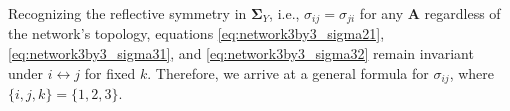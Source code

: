 \documentclass{article}
\begin{document}
Recognizing the reflective symmetry in $\mathbf{\Sigma}_Y$, i.e., $\sigma_{ij}=\sigma_{ji}$ for any $\mathbf{A}$ regardless of the network's topology, equations \ref{eq:network3by3_sigma21}, \ref{eq:network3by3_sigma31}, and \ref{eq:network3by3_sigma32} remain invariant under $i \leftrightarrow j$ for fixed $k$. Therefore, we arrive at a general formula for $\sigma_{ij}$, where $\{i,j,k \}=\{1,2,3\}$.

\end{document}
